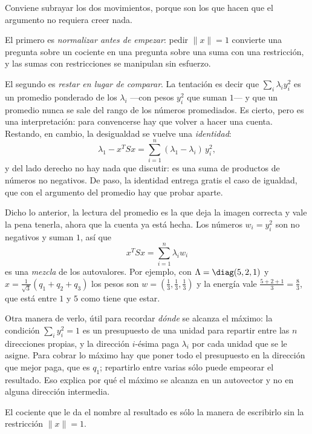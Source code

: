 \begin{remark}\label{obs:rayleigh-resta}
Conviene subrayar los dos movimientos, porque son los que hacen que el
argumento no requiera creer nada.

El primero es \emph{normalizar antes de empezar}: pedir $\|x\|=1$ convierte
una pregunta sobre un cociente en una pregunta sobre una suma con una
restricción, y las sumas con restricciones se manipulan sin esfuerzo.

El segundo es \emph{restar en lugar de comparar}. La tentación es decir que
$\sum_i\lambda_iy_i^2$ es un promedio ponderado de los $\lambda_i$ ---con
pesos $y_i^2$ que suman $1$--- y que un promedio nunca se sale del rango de
los números promediados. Es cierto, pero es una interpretación: para
convencerse hay que volver a hacer una cuenta. Restando, en cambio, la
desigualdad se vuelve una \emph{identidad}:
\[
\lambda_1 - x^TSx = \sum_{i=1}^n (\lambda_1-\lambda_i)\,y_i^2 ,
\]
y del lado derecho no hay nada que discutir: es una suma de productos de
números no negativos. De paso, la identidad entrega gratis el caso de
igualdad, que con el argumento del promedio hay que probar aparte.
\end{remark}

\begin{remark}\label{obs:rayleigh-promedio}
Dicho lo anterior, la lectura del promedio es la que deja la imagen correcta y
vale la pena tenerla, ahora que la cuenta ya está hecha. Los números
$w_i=y_i^2$ son no negativos y suman $1$, así que
\[
x^TSx=\sum_{i=1}^n \lambda_i w_i
\]
es una \emph{mezcla} de los autovalores. Por ejemplo, con
$\Lambda=\diag(5,2,1)$ y $x=\frac1{\sqrt3}(q_1+q_2+q_3)$ los pesos son
$w=(\frac13,\frac13,\frac13)$ y la energía vale $\frac{5+2+1}{3}=\frac83$, que
está entre $1$ y $5$ como tiene que estar.

Otra manera de verlo, útil para recordar \emph{dónde} se alcanza el máximo:
la condición $\sum_iy_i^2=1$ es un presupuesto de una unidad para repartir
entre las $n$ direcciones propias, y la dirección $i$-ésima paga $\lambda_i$
por cada unidad que se le asigne. Para cobrar lo máximo hay que poner todo el
presupuesto en la dirección que mejor paga, que es $q_1$; repartirlo entre
varias sólo puede empeorar el resultado. Eso explica por qué el máximo se
alcanza en un autovector y no en alguna dirección intermedia.
\end{remark}

El cociente que le da el nombre al resultado es sólo la manera de escribirlo
sin la restricción $\|x\|=1$.

